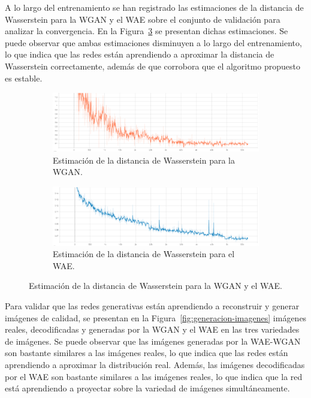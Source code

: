 A lo largo del entrenamiento se han registrado las estimaciones de la distancia de Wasserstein para la WGAN y el WAE sobre el conjunto de validación para analizar la convergencia. En la Figura~\ref{fig:wass-dist} se presentan dichas estimaciones. Se puede observar que ambas estimaciones disminuyen a lo largo del entrenamiento, lo que indica que las redes están aprendiendo a aproximar la distancia de Wasserstein correctamente, además de que corrobora que el algoritmo propuesto es estable.

\begin{figure}[H]
    \begin{subfigure}[b]{0.8\textwidth}
        \centering
        \includegraphics[width=\textwidth]{img/wgan-wae/wass-dist-wgan.png}
        \caption{Estimación de la distancia de Wasserstein para la WGAN.}
        \label{fig:wass-dist-wgan}
    \end{subfigure}
    \begin{subfigure}[b]{0.8\textwidth}
        \centering
        \includegraphics[width=\textwidth]{img/wgan-wae/wass-dist-wae.png}
        \caption{Estimación de la distancia de Wasserstein para el WAE.}
        \label{fig:wass-dist-wae}
    \end{subfigure}
    \caption{Estimación de la distancia de Wasserstein para la WGAN y el WAE.}
    \label{fig:wass-dist}
\end{figure}

Para validar que las redes generativas están aprendiendo a reconstruir y generar imágenes de calidad, se presentan en la Figura~\ref{fig:generacion-imagenes} imágenes reales, decodificadas y generadas por la WGAN y el WAE en las tres variedades de imágenes. Se puede observar que las imágenes generadas por la WAE-WGAN son bastante similares a las imágenes reales, lo que indica que las redes están aprendiendo a aproximar la distribución real. Además, las imágenes decodificadas por el WAE son bastante similares a las imágenes reales, lo que indica que la red está aprendiendo a proyectar sobre la variedad de imágenes simultáneamente.

